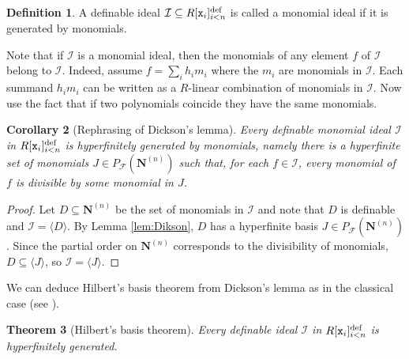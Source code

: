 \documentclass{amsart}
\newcommand{\ca}{\mathcal}
\newcommand{\ideal}[1]{\ca #1}
\theoremstyle{plain}
\newtheorem{thm}{Theorem}[section]
\newtheorem{cor}[thm]{Corollary}
\theoremstyle{definition}
\newtheorem{defn}[thm]{Definition}
\newcommand{\pF}{P_{\ca F}}
\newcommand{\hn}{\mathbf N}
\newcommand{\polyn}[2]{{#1}[{\tt x}_i]_{i<#2}^\text{def}}
\begin{document}
\begin{defn}
A definable ideal $\ideal I \subseteq \polyn R n$ is called a monomial ideal if it is generated by monomials. 
\end{defn}

Note that if $\ideal I$ is a monomial ideal, then the monomials of any element $f$ of $\ideal I$ belong to $\ideal I$. Indeed, assume $f=\sum_i h_i m_i$ where the $m_i$ are monomials in $\ideal I$. Each summand $h_im_i$ can be written as a $R$-linear combination of monomials in $\ideal I$. Now use the fact that if two polynomials coincide they have the same monomials.

\begin{cor}[Rephrasing of Dickson's lemma] \label{cor:Dikson2}
Every definable monomial ideal $\ideal I$ in $\polyn R n$ is hyperfinitely generated by monomials, namely there is a hyperfinite set of monomials $J\in \pF(\hn^{(n)})$ such that, for each $f \in  \ideal I$, every monomial of $f$ is divisible by some monomial in $J$.   
\end{cor}

\begin{proof} 
Let $D\subseteq \hn^{(n)}$ be the set of monomials in $\ideal I$ and note that  $D$ is definable and $\ideal I = \langle D \rangle$. By Lemma \ref{lem:Dikson}, $D$ has a hyperfinite basis $J\in \pF (\hn^{(n)})$. Since the partial order on $\hn^{(n)}$ corresponds to the divisibility of monomials, $D \subseteq \langle J \rangle$, so $\ideal I = \langle J \rangle$.  
\end{proof}

We can deduce Hilbert's basis theorem from Dickson's lemma as in the classical case (see \cite[Theorem 1.13]{Stu}). 

\begin{thm}[Hilbert's basis theorem] \label{thm:hilbert} 
Every definable ideal $\ideal I$ in $\polyn R n$ is hyperfinitely generated. 
\end{thm}
\end{document}
